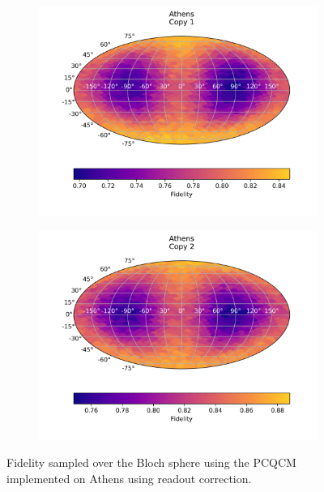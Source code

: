 \begin{figure}[H]
  \centering
  \begin{subfigure}{.5\textwidth}
    \centering
    \includegraphics[width=\textwidth]{Figures/PhaseCovariant/IBM/FullSphere/results_corrected_athens_copy1.png}
    \label{fig:pc_corrected_athens_sphere_1}
  \end{subfigure}%
  \begin{subfigure}{.5\textwidth}
    \centering
    \includegraphics[width=\textwidth]{Figures/PhaseCovariant/IBM/FullSphere/results_corrected_athens_copy2.png}
    \label{fig:pc_corrected_athens_sphere_2}
  \end{subfigure}
  \caption{Fidelity sampled over the Bloch sphere using the PCQCM implemented on Athens using readout correction.}
  \label{fig:pc_corrected_athens_sphere}
\end{figure}


